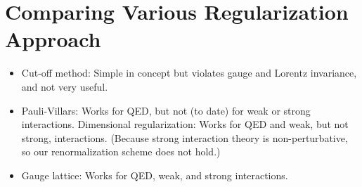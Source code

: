 \section{Comparing Various Regularization Approach}
\begin{itemize}
    \item Cut-off method: Simple in concept but violates gauge and Lorentz invariance, and not very useful. 
    \item Pauli-Villars: Works for QED, but not (to date) for weak or strong interactions. Dimensional regularization: Works for QED and weak, but not strong, interactions. (Because strong interaction theory is non-perturbative, so our renormalization scheme does not hold.) 
    \item Gauge lattice: Works for QED, weak, and strong interactions.
\end{itemize}
